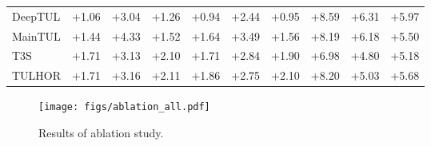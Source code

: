 \documentclass{article} %
\theoremstyle{definition}
\begin{document}
\begin{table}[h]
\begin{tabular}{lccccccccc}
        DeepTUL  & {\cellcolor[HTML]{EEF8A8}} \color[HTML]{000000} +1.06 & {\cellcolor[HTML]{CBE982}} \color[HTML]{000000} +3.04 & {\cellcolor[HTML]{EBF7A3}} \color[HTML]{000000} +1.26 & {\cellcolor[HTML]{EFF8AA}} \color[HTML]{000000} +0.94 & {\cellcolor[HTML]{D9EF8B}} \color[HTML]{000000} +2.44 & {\cellcolor[HTML]{EFF8AA}} \color[HTML]{000000} +0.95 & {\cellcolor[HTML]{39A758}} \color[HTML]{000000} +8.59 & {\cellcolor[HTML]{7DC765}} \color[HTML]{000000} +6.31 & {\cellcolor[HTML]{87CB67}} \color[HTML]{000000} +5.97 \\
        MainTUL  & {\cellcolor[HTML]{E8F59F}} \color[HTML]{000000} +1.44 & {\cellcolor[HTML]{AFDD70}} \color[HTML]{000000} +4.33 & {\cellcolor[HTML]{E6F59D}} \color[HTML]{000000} +1.52 & {\cellcolor[HTML]{E5F49B}} \color[HTML]{000000} +1.64 & {\cellcolor[HTML]{C1E57B}} \color[HTML]{000000} +3.49 & {\cellcolor[HTML]{E6F59D}} \color[HTML]{000000} +1.56 & {\cellcolor[HTML]{45AD5B}} \color[HTML]{000000} +8.19 & {\cellcolor[HTML]{82C966}} \color[HTML]{000000} +6.18 & {\cellcolor[HTML]{93D168}} \color[HTML]{000000} +5.50 \\
        T3S      & {\cellcolor[HTML]{E3F399}} \color[HTML]{000000} +1.71 & {\cellcolor[HTML]{C9E881}} \color[HTML]{000000} +3.13 & {\cellcolor[HTML]{DDF191}} \color[HTML]{000000} +2.10 & {\cellcolor[HTML]{E3F399}} \color[HTML]{000000} +1.71 & {\cellcolor[HTML]{CFEB85}} \color[HTML]{000000} +2.84 & {\cellcolor[HTML]{E0F295}} \color[HTML]{000000} +1.90 & {\cellcolor[HTML]{6BBF64}} \color[HTML]{000000} +6.98 & {\cellcolor[HTML]{A5D86A}} \color[HTML]{000000} +4.80 & {\cellcolor[HTML]{9BD469}} \color[HTML]{000000} +5.18 \\
        TULHOR   & {\cellcolor[HTML]{E3F399}} \color[HTML]{000000} +1.71 & {\cellcolor[HTML]{C9E881}} \color[HTML]{000000} +3.16 & {\cellcolor[HTML]{DDF191}} \color[HTML]{000000} +2.11 & {\cellcolor[HTML]{E2F397}} \color[HTML]{000000} +1.86 & {\cellcolor[HTML]{D1EC86}} \color[HTML]{000000} +2.75 & {\cellcolor[HTML]{DDF191}} \color[HTML]{000000} +2.10 & {\cellcolor[HTML]{45AD5B}} \color[HTML]{000000} +8.20 & {\cellcolor[HTML]{A0D669}} \color[HTML]{000000} +5.03 & {\cellcolor[HTML]{8ECF67}} \color[HTML]{000000} +5.68 \\
        \bottomrule
    \end{tabular}
\end{table}

\begin{figure}[h]
    \centering
    \texttt{[image: figs/ablation\_all.pdf]}
    \caption{Results of ablation study.}
    \label{fig:ablation}
\end{figure}
\end{document}
